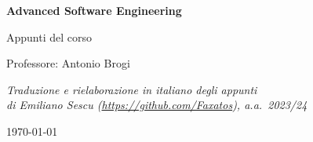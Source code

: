 \documentclass[11pt,a4paper,openany]{book}
\begin{document}
\hypersetup{pageanchor=false}
\begin{titlepage}
\centering
\vspace*{3cm}
{\Huge\bfseries\color{inkblue} Advanced Software Engineering\par}
\vspace{0.6cm}
{\Large\color{accentblue} Appunti del corso\par}
\vspace{2.2cm}
{\large Professore: Antonio Brogi\par}
\vspace{3.5cm}
{\normalsize\itshape Traduzione e rielaborazione in italiano degli appunti\\
di Emiliano Sescu (\url{https://github.com/Faxatos}), a.a.\ 2023/24\par}
\vfill
{\normalsize \today\par}
\end{titlepage}

\frontmatter
\hypersetup{pageanchor=true}
\tableofcontents

\mainmatter












\end{document}
